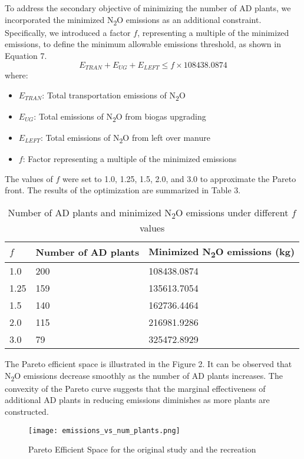 \documentclass[12pt]{article}
\begin{document}
To address the secondary objective of minimizing the number of AD plants, we incorporated the minimized N\textsubscript{2}O emissions as an additional constraint. Specifically, we introduced a factor 
$f$, representing a multiple of the minimized emissions, to define the minimum allowable emissions threshold, as shown in Equation 7.
\begin{equation}
  E_{TRAN} + E_{UG} + E_{LEFT} \leq f \times 108438.0874
\end{equation}
where:
\begin{itemize}
  \item $E_{TRAN}$: Total transportation emissions of N\textsubscript{2}O
  \item $E_{UG}$: Total emissions of N\textsubscript{2}O from biogas upgrading
  \item $E_{LEFT}$: Total emissions of N\textsubscript{2}O from left over manure
  \item $f$: Factor representing a multiple of the minimized emissions
\end{itemize}
The values of $f$ were set to 1.0, 1.25, 1.5, 2.0, and 3.0 to approximate the Pareto front. The results of the optimization are summarized in Table 3.
\begin{table}[h]
  \centering
  \begin{tabular}{|p{1.5cm} | p{5cm} | p{6cm}|}
  \hline
  \rowcolor{gray!30}
  $f$ & Number of AD plants & Minimized N\textsubscript{2}O emissions (kg) \\ \hline
  1.0 & 200 & 108438.0874 \\ \hline
  1.25 & 159 & 135613.7054 \\ \hline
  1.5 & 140 & 162736.4464 \\ \hline
  2.0 & 115 & 216981.9286 \\ \hline
  3.0 & 79 & 325472.8929 \\ \hline
  \end{tabular}
  \caption{Number of AD plants and minimized N\textsubscript{2}O emissions under different $f$ values}
  \label{tab:adplants_emissions}
\end{table}

The Pareto efficient space is illustrated in the Figure 2. It can be observed that N\textsubscript{2}O emissions decrease smoothly as the number of AD plants increases. The convexity of the Pareto curve suggests that the marginal effectiveness of additional AD plants in reducing emissions diminishes as more plants are constructed.

\begin{figure}[H]
  \centering
  \texttt{[image: emissions\_vs\_num\_plants.png]}
  \caption{Pareto Efficient Space for the original study and the recreation}
  \label{fig:pareto_curve}
\end{figure}
\end{document}
